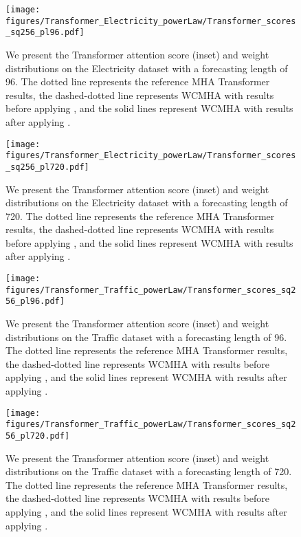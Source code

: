 \begin{figure*}[!ht]
    \centering
    \texttt{[image: figures/Transformer\_Electricity\_powerLaw/Transformer\_scores\_sq256\_pl96.pdf]}
    \caption{We present the Transformer attention score (inset) and weight distributions on the Electricity dataset with a forecasting length of 96. The dotted line represents the reference MHA Transformer results, the dashed-dotted line represents WCMHA with \fpl{} results before applying \maskCL, and the solid lines represent WCMHA with \fpl{} results after applying \maskCL.}
    \label{fig:transformer_electricity_96_attn_full}
\end{figure*}

\begin{figure*}[!ht]
    \centering
    \texttt{[image: figures/Transformer\_Electricity\_powerLaw/Transformer\_scores\_sq256\_pl720.pdf]}
    \caption{We present the Transformer attention score (inset) and weight distributions on the Electricity dataset with a forecasting length of 720. The dotted line represents the reference MHA Transformer results, the dashed-dotted line represents WCMHA with \fpl{} results before applying \maskCL, and the solid lines represent WCMHA with \fpl{} results after applying \maskCL.}
    \label{fig:transformer_electricity_720_attn_full}
\end{figure*}

\begin{figure*}[!ht]
    \centering
    \texttt{[image: figures/Transformer\_Traffic\_powerLaw/Transformer\_scores\_sq256\_pl96.pdf]}
    \caption{We present the Transformer attention score (inset) and weight distributions on the Traffic dataset with a forecasting length of 96. The dotted line represents the reference MHA Transformer results, the dashed-dotted line represents WCMHA with \fpl{} results before applying \maskCL, and the solid lines represent WCMHA with \fpl{} results after applying \maskCL.}
    \label{fig:transformer_traffic_96_attn_full}
\end{figure*}

\begin{figure*}[!ht]
    \centering
    \texttt{[image: figures/Transformer\_Traffic\_powerLaw/Transformer\_scores\_sq256\_pl720.pdf]}
    \caption{We present the Transformer attention score (inset) and weight distributions on the Traffic dataset with a forecasting length of 720. The dotted line represents the reference MHA Transformer results, the dashed-dotted line represents WCMHA with \fpl{} results before applying \maskCL, and the solid lines represent WCMHA with \fpl{} results after applying \maskCL.}
    \label{fig:transformer_traffic_720_attn_full}
\end{figure*}
